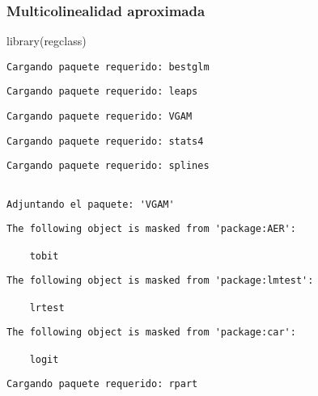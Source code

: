 \documentclass[
  letterpaper,
  DIV=11,
  numbers=noendperiod]{scrreprt}
\newenvironment{Shaded}{\begin{snugshade}}{\end{snugshade}}
\newcommand{\FunctionTok}[1]{\textcolor[rgb]{0.28,0.35,0.67}{#1}}
\newcommand{\NormalTok}[1]{\textcolor[rgb]{0.00,0.23,0.31}{#1}}
\begin{document}
\subsubsection{Multicolinealidad
aproximada}\label{multicolinealidad-aproximada}

\begin{Shaded}
\begin{Highlighting}[]
\FunctionTok{library}\NormalTok{(regclass)}
\end{Highlighting}
\end{Shaded}

\begin{verbatim}
Cargando paquete requerido: bestglm
\end{verbatim}

\begin{verbatim}
Cargando paquete requerido: leaps
\end{verbatim}

\begin{verbatim}
Cargando paquete requerido: VGAM
\end{verbatim}

\begin{verbatim}
Cargando paquete requerido: stats4
\end{verbatim}

\begin{verbatim}
Cargando paquete requerido: splines
\end{verbatim}

\begin{verbatim}

Adjuntando el paquete: 'VGAM'
\end{verbatim}

\begin{verbatim}
The following object is masked from 'package:AER':

    tobit
\end{verbatim}

\begin{verbatim}
The following object is masked from 'package:lmtest':

    lrtest
\end{verbatim}

\begin{verbatim}
The following object is masked from 'package:car':

    logit
\end{verbatim}

\begin{verbatim}
Cargando paquete requerido: rpart
\end{verbatim}
\end{document}
